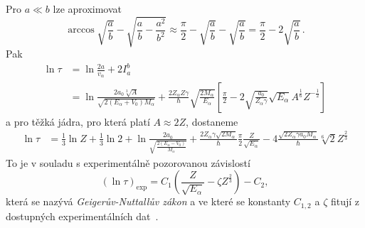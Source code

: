 \begin{solution}
	\begin{note}
		Pro $a\ll b$ lze aproximovat
		\begin{equation}
			\arccos{\sqrt{\frac{a}{b}}}-\sqrt{\frac{a}{b}-\frac{a^{2}}{b^{2}}}\approx\frac{\pi}{2}-\sqrt{\frac{a}{b}}-\sqrt{\frac{a}{b}}=\frac{\pi}{2}-2\sqrt{\frac{a}{b}}\,.
		\end{equation}
		Pak
		\begin{align}
			\ln\tau
				&=\ln{\frac{2a}{v_{\alpha}}}+2I_{a}^{b}\nonumber\\
				&=\ln{\frac{2a_{0}\sqrt[3]{A}}{\sqrt{2\left(E_{\alpha}+V_{0}\right){M_{\alpha}}}}}
					+\frac{2Z_{\alpha}Z\gamma}{\hbar}\sqrt{\frac{2M_{\alpha}}{E_{\alpha}}}\left[\frac{\pi}{2}-2\sqrt{\frac{a_{0}}{Z_{\alpha}\gamma}}\sqrt{E_{\alpha}}A^{\frac{1}{6}}Z^{-\frac{1}{2}}\right]
		\end{align}
		a pro těžká jádra, pro která platí $A\approx 2Z$, dostaneme
		\begin{align}
			\ln\tau&=\frac{1}{3}\ln{Z}+\frac{1}{3}\ln{2}+\ln{\frac{2a_{0}}{\sqrt{\frac{2\left(E_{\alpha}-V_{0}\right)}{M_{\alpha}}}} }+\frac{2Z_{\alpha}\gamma\sqrt{2M_{\alpha}}}{\hbar}\frac{\pi}{2}\frac{Z}{\sqrt{E_{\alpha}}}
				-4\frac{\sqrt{2Z_{\alpha}\gamma a_{0}M_{\alpha}}}{\hbar}\sqrt[6]{2}Z^{\frac{2}{3}}
		\end{align}
		To je v souladu s experimentálně pozorovanou závislostí
		\begin{equation}
			(\ln{\tau})_{\mathrm{exp}}=C_{1}\left(\frac{Z}{\sqrt{E_{\alpha}}}-\zeta Z^{\frac{2}{3}}\right)-C_{2},
		\end{equation}
		která se nazývá \emph{Geigerův-Nuttallův zákon} a ve které se konstanty $C_{1,2}$ a $\zeta$ fitují z dostupných experimentálních dat~\cite{Geiger1911}.
	\end{note}
\end{solution}
